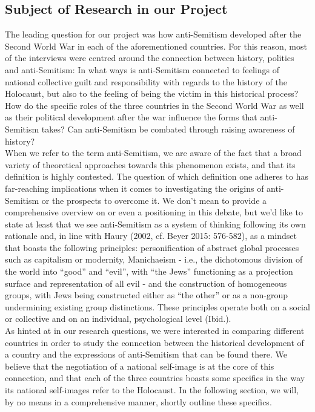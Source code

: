 \subsection*{Subject of Research in our Project}
The leading question for our project was how anti-Semitism developed after the Second World War in each of the aforementioned countries. For this reason, most of the interviews were centred around the connection between history, politics and anti-Semitism: In what ways is anti-Semitism connected to feelings of national collective guilt and responsibility with regards to the history of the Holocaust, but also to the feeling of being the victim in this historical process? How do the specific roles of the three countries in the Second World War as well as their political development after the war influence the forms that anti-Semitism takes? Can anti-Semitism be combated through raising awareness of history? \\
When we refer to the term anti-Semitism, we are aware of the fact that a broad variety of theoretical approaches towards this phenomenon exists, and that its definition is highly contested. The question of which definition one adheres to has far-reaching implications when it comes to investigating the origins of anti-Semitism or the prospects to overcome it. We don't mean to provide a comprehensive overview on or even a positioning in this debate, but we'd like to state at least that we see anti-Semitism as a system of thinking following its own rationale and, in line with Haury (2002, cf. Beyer 2015: 576-582), as a mindset that boasts the following principles: personification of abstract global processes such as capitalism or modernity, Manichaeism - i.e., the dichotomous division of the world into ``good'' and ``evil'', with ``the Jews'' functioning as a projection surface and representation of all evil - and the construction of homogeneous groups, with Jews being constructed either as ``the other'' or as a non-group undermining existing group distinctions. These principles operate both on a social or collective and on an individual, psychological level (Ibid.).\\
As hinted at in our research questions, we were interested in comparing different countries in order to study the connection between the historical development of a country and the expressions of anti-Semitism that can be found there. We believe that the negotiation of a national self-image is at the core of this connection, and that each of the three countries boasts some specifics in the way its national self-images refer to the Holocaust. In the following section, we will, by no means in a comprehensive manner, shortly outline these specifics. \par
